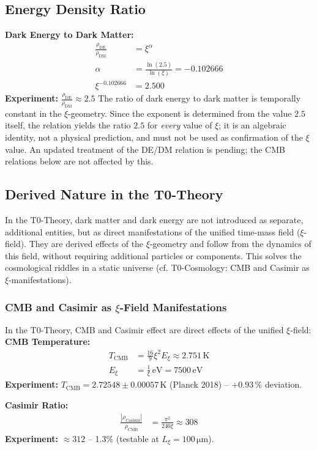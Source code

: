 	\subsection{Energy Density Ratio}
	\textbf{Dark Energy to Dark Matter:}
	\begin{align}
		\frac{\rho_{\text{DE}}}{\rho_{\text{DM}}} &= \xi^{\alpha} \\
		\alpha &= \frac{\ln(2.5)}{\ln(\xi)} = -0.102666 \\
		\xi^{-0.102666} &= 2.500
	\end{align}
	\textbf{Experiment:} $\frac{\rho_{\text{DE}}}{\rho_{\text{DM}}} \approx 2.5$
	The ratio of dark energy to dark matter is temporally constant in the $\xi$-geometry. Since the exponent is determined from the value $2.5$ itself, the relation yields the ratio $2.5$ for \emph{every} value of $\xi$; it is an algebraic identity, not a physical prediction, and must not be used as confirmation of the $\xi$ value. An updated treatment of the DE/DM relation is pending; the CMB relations below are not affected by this.
	
	\subsection{Derived Nature in the T0-Theory}
	In the T0-Theory, dark matter and dark energy are not introduced as separate, additional entities, but as direct manifestations of the unified time-mass field ($\xi$-field). They are derived effects of the $\xi$-geometry and follow from the dynamics of this field, without requiring additional particles or components. This solves the cosmological riddles in a static universe (cf. T0-Cosmology: CMB and Casimir as $\xi$-manifestations).
	
	\subsubsection{CMB and Casimir as $\xi$-Field Manifestations}
	In the T0-Theory, CMB and Casimir effect are direct effects of the unified $\xi$-field:
	\textbf{CMB Temperature:}
	\begin{align}
		T_{\text{CMB}} &= \frac{16}{9} \xi^2 E_\xi \approx 2.751\,\si{\kelvin} \\
		E_\xi &= \frac{1}{\xi}\,\si{\electronvolt} = 7500\,\si{\electronvolt}
	\end{align}
	\textbf{Experiment:} $T_{\text{CMB}} = 2.72548 \pm 0.00057\,\si{\kelvin}$ (Planck 2018) – $+0.93\,\%$ deviation.
	
	\textbf{Casimir Ratio:}
	\begin{align}
		\frac{|\rho_{\text{Casimir}}|}{\rho_{\text{CMB}}} &= \frac{\pi^2}{240 \xi} \approx 308
	\end{align}
	\textbf{Experiment:} $\approx 312$ – 1.3\% (testable at $L_\xi = 100\,\si{\micro\meter}$).
	
